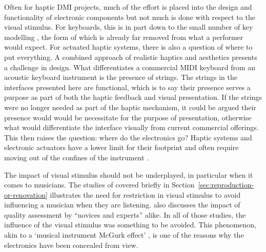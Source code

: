 Often for haptic DMI projects, much of the effort is placed into the design and functionality of electronic components but not much is done with respect to the visual stimulus. 
For keyboards, this is in part down to the small number of key modelling \cite{gillespie_haptic_1996,lozada_modelisations_2007,timmermans_multibody-based_2020}, the form of which is already far removed from what a performer would expect. For actuated haptic systems, there is also a question of where to put everything. A combined approach of realistic haptics and aesthetics presents a challenge in design. What differentiates a commercial MIDI keyboard from an acoustic keyboard instrument is the presence of strings. The strings in the interfaces presented here are functional, which is to say their presence serves a purpose as part of both the haptic feedback and visual presentation. If the strings were no longer needed as part of the haptic mechanism, it could be argued their presence would would be necessitate for the purpose of presentation, otherwise what would differentiate the interface visually from current commercial offerings. This then raises the question: where do the electronics go? Haptic systems and electronic actuators have a lower limit for their footprint and often require moving out of the confines of the instrument \cite{mcpherson_augmented_2010, schmidt_sparksichord_2025}.

The impact of visual stimulus should not be underplayed, in particular when it comes to musicians.
The studies of \textcite{fritz_player_2012, fritz_soloist_2014, fritz_listener_2017} covered briefly in Section~\ref{sec:reproduction-or-renovation} illustrates the need for restriction in visual stimulus to avoid influencing a musician when they are listening.
\textcite{tsay_sight_2013} also discusses the impact of quality assessment by ``novices and experts'' alike. In all of those studies, the influence of the visual stimulus was something to be avoided.
This phenomenon, akin to a `musical instrument McGurk effect’ \cite{mcgurk_hearing_1976}, is one of the reasons why the electronics have been concealed from view. 

